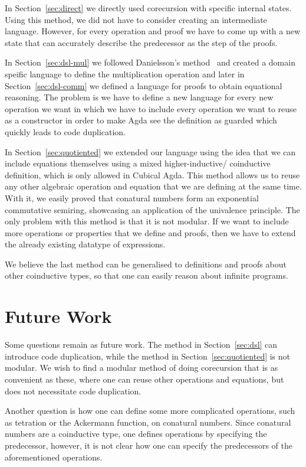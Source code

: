 \documentclass[sigplan, screen, natbib=false]{acmart}
\begin{document}
In Section~\ref{sec:direct} we directly used corecursion with specific internal
states. Using this method, we did not have to consider creating an intermediate
language. However, for every operation and proof we have to come up with a new
state that can accurately describe the predecessor as the step of the proofs.

In Section~\ref{sec:dsl-mul} we followed Danielsson's
method~\cite{danielsson-beating} and created a domain speific language to define
the multiplication operation and later in Section~\ref{sec:dsl-comm} we defined
a language for proofs to obtain equational reasoning. The problem is we have to
define a new language for every new operation we want in which we have to
include every operation we want to reuse as a constructor in order to make Agda
see the definition as guarded which quickly leads to code duplication.

In Section~\ref{sec:quotiented} we extended our language using the idea that we
can include equations themselves using a mixed higher-inductive\slash
coinductive definition, which is only allowed in Cubical Agda. This method
allows us to reuse any other algebraic operation and equation that we are
defining at the same time. With it, we easily proved that conatural numbers form
an exponential commutative semiring, showcasing an application of the univalence
principle. The only problem with this method is that it is not modular. If we
want to include more operations or properties that we define and proofs, then we
have to extend the already existing datatype of expressions.

We believe the last method can be generalised to definitions and proofs about
other coinductive types, so that one can easily reason about infinite programs.

\section{Future Work}

Some questions remain as future work. The method in Section~\ref{sec:dsl} can
introduce code duplication, while the method in Section~\ref{sec:quotiented} is
not modular. We wish to find a modular method of doing corecursion that is as
convenient as these, where one can reuse other operations and equations, but
does not necessitate code duplication.

Another question is how one can define some more complicated operations, such as
tetration or the Ackermann function, on conatural numbers. Since conatural
numbers are a coinductive type, one defines operations by specifying the
predecessor, however, it is not clear how one can specify the predecessors of
the aforementioned operations.
\end{document}
